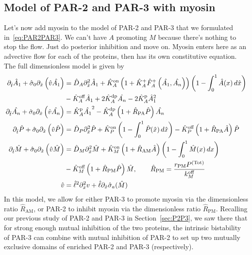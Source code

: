 \documentclass[11pt]{article}
\newcommand{\red}[1]{\color{red}#1\normalcolor}
\newcommand{\6}[1]{#1_{\text{6}}}
\newcommand{\3}[1]{#1_{\text{3}}}
\newcommand{\Tot}[1]{#1^\text{(Tot)}}
\begin{document}
\subsection{Model of PAR-2 and PAR-3 with myosin  \label{sec:P2P3My}}
Let's now add myosin to the model of PAR-2 and PAR-3 that we formulated in\ \eqref{eq:PAR2PAR3}. \red{We can't have $A$ promoting $M$ because there's nothing to stop the flow. Just do posterior inhibition and move on.} Myosin enters here as an advective flow for each of the proteins, then has its own constitutive equation. The full dimensionless model is given by
\begin{subequations}
\label{eq:PAR2PAR3My}
\begin{align}
\nonumber
\Dthat \hat{A}_1 +\hat{\sigma}_0  \Dxhat \left(\hat{v} \hat{\MA} \right)  &=\DhatA \Dxhat^2 \hat{A}_1 +\KhatonA\left(1+\hat{K}_A^+ \hat F_A^+\left(\hat{\MA},\hat{\PA}\right)\right)\left(1 - \int_0^1 \hat{A}(x) \, d\hat{x} \right) \\  
 &-\KhatoffA \hat{A}_1 +2\KhatdpA \hat{\PA}-2 \KhatpA \hat{A}_1^2 \\ 
\Dthat \hat{\PA} +\hat{\sigma}_0  \Dxhat \left(\hat{v} \hat{\PA} \right)  &=\KhatpA \hat{\MA}^2- \KhatdpA \left(1+\hat{R}_\text{PA}\hat{P}\right)\hat{\PA} \\ 
\Dthat \hat{P} +\hat{\sigma}_0  \Dxhat \left(\hat{v} \hat{P} \right) & =\DhatP \Dxhat^2 \hat{P}+\KhatonP \left(1 - \int_0^1 \hat{P}(\hat x) \, d\hat{x} \right)  - \KhatoffP\left(1+\hat{R}_\text{PA} \hat{A}\right)\hat{P} \\ 
\Dthat \hat{M} +\hat{\sigma}_0  \Dxhat \left(\hat{v} \hat{M} \right) &=\hat{D}_M \Dxhat^2 \hat{M} +\KhatonM \left(1+\hat R_\text{AM} \hat{A}\right)\left(1-\int_0^1  \hat{M}(x) \, dx\right)\\ \nonumber &- \KhatoffM\left(1+\hat{R}_\text{PM} \hat{P} \right) \hat{M},\qquad \hat{R}_\text{PM}=\frac{r_\text{PM}\Tot{P}}{\koff_M}\\
\hat{v} &= \hat{\ell}^2 \Dxhat^2 v +\hat{\ell} \Dxhat \hat{\sigma}_a(\hat{M})
\end{align}
\end{subequations}
In this model, we allow for either PAR-3 to promote myosin via the dimensionless ratio $\hat{R}_\text{AM}$, or PAR-2 to inhibit myosin via the dimensionless ratio $\hat{R}_\text{PM}$. Recalling our previous study of PAR-2 and PAR-3 in Section\ \ref{sec:P2P3}, we saw there that for strong enough mutual inhibition of the two proteins, the intrinsic bistability of PAR-3 can combine with mutual inhibition of PAR-2 to set up two mutually exclusive domains of enriched PAR-2 and PAR-3 (respectively). 
\end{document}
